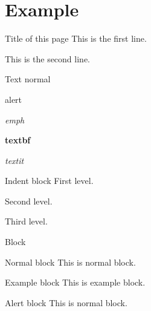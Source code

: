 
\section{Example}
\begin{frame}{Title of this page}
  This is the first line.\par
    \pause%
  This is the second line.
\end{frame}

\begin{frame}{Text}
  normal\par
  \alert{alert}\par
  \emph{emph}\par
  \textbf{textbf}\par
  \textit{textit}\par
\end{frame}

\begin{frame}{Indent block}
  First level.
  \pskip
  \begin{indentblock}
    Second level.
    \begin{indentblock}
      Third level.
    \end{indentblock}
  \end{indentblock}
\end{frame}

\begin{frame}{Block}
  \begin{block}{Normal block}
    This is normal block.
  \end{block}
  \begin{exampleblock}{Example block}
    This is example block.
  \end{exampleblock}
  \begin{alertblock}{Alert block}
    This is normal block.
  \end{alertblock}
\end{frame}

